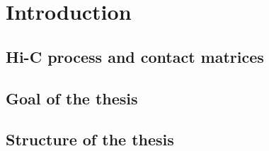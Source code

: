 \section{Introduction}
\subsection{Hi-C process and contact matrices}
\subsection{Goal of the thesis}
\subsection{Structure of the thesis}
